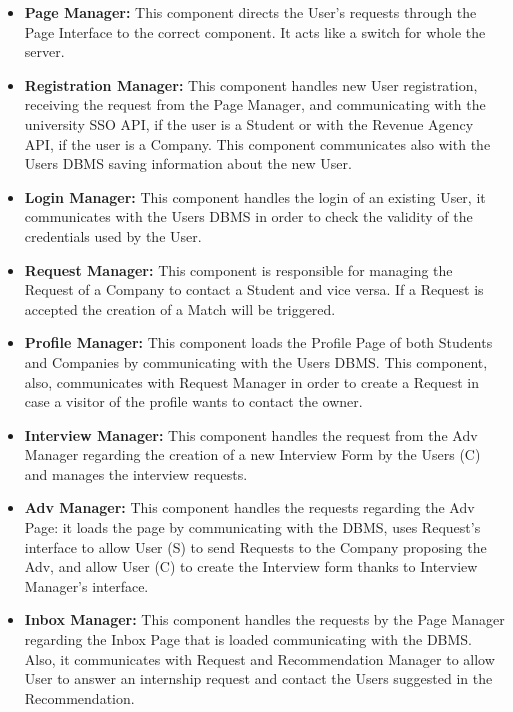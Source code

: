 \begin{itemize}
    \item \textbf{Page Manager:} This component directs the User's requests through the Page Interface to the correct component. It acts like a switch for whole the server.
    
    \item \textbf{Registration Manager:} This component handles new User registration, receiving the request from the Page Manager, and communicating with the university SSO API, if the user is a Student or with the Revenue Agency API, if the user is a Company. This component communicates also with the Users DBMS saving information about the new User.

    \item \textbf{Login Manager:} This component handles the login of an existing User, it communicates with the Users DBMS in order to check the validity of the credentials used by the User.

    \item \textbf{Request Manager:} This component is responsible for managing the Request of a Company to contact a Student and vice versa. If a Request is accepted the creation of a Match will be triggered.

    \item \textbf{Profile Manager:} This component loads the Profile Page of both Students and Companies by communicating with the Users DBMS. This component, also, communicates with Request Manager in order to create a Request in case a visitor of the profile wants to contact the owner.

    \item \textbf{Interview Manager:} This component handles the request from the Adv Manager regarding the creation of a new Interview Form by the Users (C) and manages the interview requests.

    \item \textbf{Adv Manager:} This component handles the requests regarding the Adv Page: it loads the page by communicating with the DBMS, uses Request's interface to allow User (S) to send Requests to the Company proposing the Adv, and allow User (C) to create the Interview form thanks to Interview Manager's interface.

    \item \textbf{Inbox Manager:} This component handles the requests by the Page Manager regarding the Inbox Page that is loaded communicating with the DBMS. Also, it communicates with Request and Recommendation Manager to allow User to answer an internship request and contact the Users suggested in the Recommendation.


\end{itemize}
